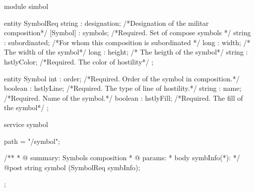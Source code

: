 module simbol {

  entity SymbolReq {
     string : designation; /*Designation of the militar composition*/
   [Symbol] : symbols;      /*Required. Set of compose symbols */
     string : subordinated; /*For whom this composition is subordinated */
       long : width;        /* The width of the symbol*/
       long : height;       /* The heigth of the symbol*/
     string : hstlyColor;   /*Required. The color of hostility*/
   };

   entity Symbol {
         int : order;     /*Required. Order of the symbol in composition.*/
     boolean : hstlyLine; /*Required. The type of line of hostility.*/
      string : name;      /*Required. Name of the symbol.*/
     boolean : hstlyFill; /*Required. The fill of the symbol*/
   };

   service symbol {
      path = "/symbol";

      /**
      * @ summary: Symbols composition
      * @ params:
      *   body symbInfo(*):
      */
      @post string symbol (SymbolReq symbInfo);
  }; 
}
